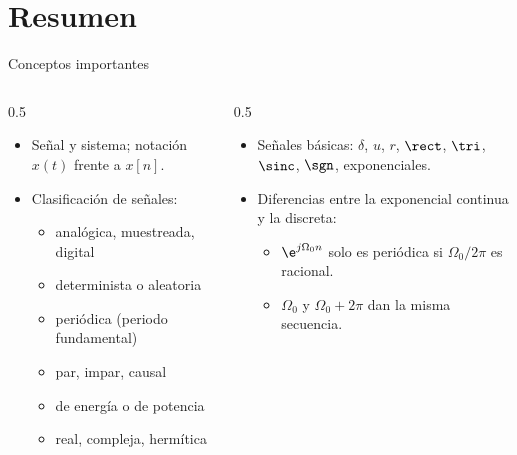 \documentclass[aspectratio=169,11pt]{beamer}
\begin{document}
\section*{Resumen}
\begin{frame}{Conceptos importantes}
  \begin{columns}[T]
    \begin{column}{0.5\textwidth}
      \begin{itemize}
        \item Señal y sistema; notación $x(t)$ frente a $x[n]$.
        \item Clasificación de señales:
        \begin{itemize}\small
          \item analógica, muestreada, digital
          \item determinista o aleatoria
          \item periódica (periodo fundamental)
          \item par, impar, causal
          \item de energía o de potencia
          \item real, compleja, hermítica
        \end{itemize}
      \end{itemize}
    \end{column}
    \begin{column}{0.5\textwidth}
      \begin{itemize}
        \item Señales básicas: $\delta$, $u$, $r$, $\rect$, $\tri$, $\sinc$, $\sgn$, exponenciales.
        \item \alert{Diferencias entre la exponencial continua y la discreta}:
        \begin{itemize}\small
          \item $\e^{j\Omega_0n}$ solo es periódica si $\Omega_0/2\pi$ es racional.
          \item $\Omega_0$ y $\Omega_0+2\pi$ dan la misma secuencia.
        \end{itemize}
      \end{itemize}
    \end{column}
  \end{columns}
  \bigskip
\end{frame}
\end{document}
